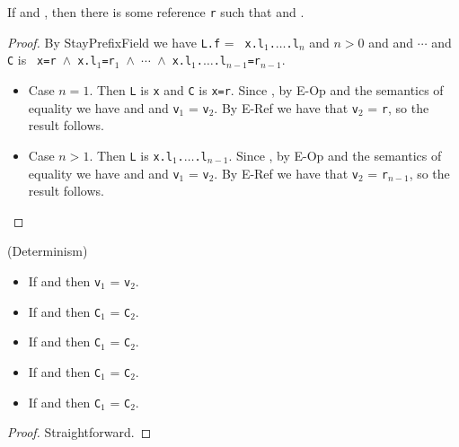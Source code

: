 \begin{Lemma}
\label{lem:stayPrefix}
If \emph{} and
\emph{}, then there is some
reference {\tt r} such that 
\emph{} and
\emph{}.
\end{Lemma}
\begin{proof}
By {\sc StayPrefixField} we have {\tt L.f} = {\tt
x.l$_1$.$\ldots$.l$_n$} and $n>0$ and 
and  $\cdots$
 and {\tt
  C} is {\tt
  x=r\,$\wedge$\,x.l$_1$=r$_1$\,$\wedge$\,$\cdots$\,$\wedge$\,x.l$_1$.$\ldots$.l$_{n-1}$=r$_{n-1}$}.  
\begin{itemize}
\item Case $n=1$.  Then {\tt L} is {\tt x} and {\tt C} is {\tt x=r}.
  Since , by {\sc E-Op} and
  the semantics of equality we have 
   and
   and {\tt v$_1$} = {\tt v$_2$}.  By
{\sc E-Ref} we have that {\tt v$_2$} = {\tt r}, so the result follows.
\item Case $n>1$.  Then {\tt L} is {\tt x.l$_1$.$\ldots$.l$_{n-1}$}.
  Since , by {\sc E-Op} and
  the semantics of equality we have 
   and
   and {\tt v$_1$} = {\tt v$_2$}.  By
{\sc E-Ref} we have that {\tt v$_2$} = {\tt r$_{n-1}$}, so the result follows.
\end{itemize}
\end{proof}

\begin{Lemma}
\label{lem:det}
(Determinism)
\begin{itemize}
\item If  and 
then {\tt v$_1$} = {\tt v$_2$}.
\item If  and 
  then {\tt C$_1$} = {\tt C$_2$}.
\item If  and 
  then {\tt C$_1$} = {\tt C$_2$}.
\item If  and  
  then {\tt C$_1$} = {\tt C$_2$}.
\item If  and  
  then {\tt C$_1$} = {\tt C$_2$}.
\end{itemize}
\end{Lemma}
\begin{proof}
Straightforward.
\end{proof}

